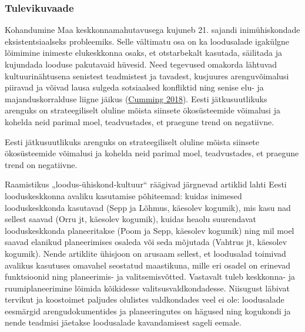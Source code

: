 \documentclass[estonian,]{article}
\begin{document}
\hypertarget{tulevikuvaade}{%
\subsubsection*{Tulevikuvaade}\label{tulevikuvaade}}

Kohandumine Maa keskkonnamahutavusega kujuneb 21. sajandi inimühiskondade eksistentsiaalseks probleemiks. Selle vältimatu osa on ka loodusalade igakülgne lõimimine inimeste elukeskkonna osaks, et otstarbekalt kasutada, säilitada ja kujundada looduse pakutavaid hüvesid. Need tegevused omakorda lähtuvad kultuurinähtusena senistest teadmistest ja tavadest, kusjuures arenguvõimalusi piiravad ja võivad lausa sulgeda sotsiaalsed konfliktid ning senise elu- ja majanduskorralduse liigne jäikus (\protect\hyperlink{Cumming2018}{Cumming 2018}). Eesti jätkusuutlikuks arenguks on strateegiliselt oluline mõista siinsete ökosüsteemide võimalusi ja kohelda neid parimal moel, teadvustades, et praegune trend on negatiivne.

\begin{blockquote-left}
Eesti jätkusuutlikuks arenguks on strateegiliselt oluline mõista
siinsete ökosüsteemide võimalusi ja kohelda neid parimal moel,
teadvustades, et praegune trend on negatiivne.
\end{blockquote-left}

Raamistikus „loodus-ühiskond-kultuur`` räägivad järgnevad artiklid lahti Eesti looduskeskkonna avaliku kasutamise põhiteemad: kuidas inimesed looduskeskkonda kasutavad (Sepp ja Lõhmus, käesolev kogumik), mis kasu nad sellest saavad (Orru jt, käesolev kogumik), kuidas heaolu suurendavat looduskeskkonda planeeritakse (Poom ja Sepp, käesolev kogumik) ning mil moel saavad elanikud planeerimises osaleda või seda mõjutada (Vahtrus jt, käesolev kogumik). Nende artiklite ühisjoon on arusaam sellest, et loodusalad toimivad avalikus kasutuses omavahel seostatud maastikuna, mille eri osadel on erinevad funktsioonid ning planeerimis- ja valitsemisvõtted. Vastavalt tuleb keskkonna- ja ruumiplaneerimine lõimida kõikidesse valitsusvaldkondadesse. Niisugust läbivat tervikut ja koostoimet paljudes olulistes valdkondades veel ei ole: loodusalade eesmärgid arengudokumentides ja planeeringutes on hägused ning kogukondi ja nende teadmisi jäetakse loodusalade kavandamisest sageli eemale.
\end{document}
